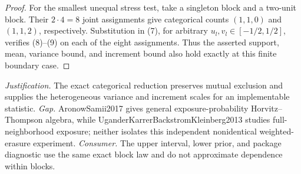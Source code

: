 \documentclass{article}
\begin{document}
\begin{proof}
For the smallest unequal stress test, take a singleton block and a two-unit block. Their \(2\cdot4=8\) joint assignments give categorical counts \((1,1,0)\) and \((1,1,2)\), respectively. Substitution in (7), for arbitrary \(u_l,v_l\in[-1/2,1/2]\), verifies (8)--(9) on each of the eight assignments. Thus the asserted support, mean, variance bound, and increment bound also hold exactly at this finite boundary case.
\end{proof}
\par\smallskip\noindent \textit{Justification.} The exact categorical reduction preserves mutual exclusion and supplies the heterogeneous variance and increment scales for an implementable statistic. \textit{Gap.} AronowSamii2017 gives general exposure-probability Horvitz--Thompson algebra, while UganderKarrerBackstromKleinberg2013 studies full-neighborhood exposure; neither isolates this independent nonidentical weighted-erasure experiment. \textit{Consumer.} The upper interval, lower prior, and package diagnostic use the same exact block law and do not approximate dependence within blocks.
\end{document}
